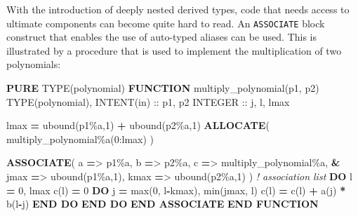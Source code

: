 \documentclass[
]{article}
\newenvironment{Shaded}{}{}
\newcommand{\BuiltInTok}[1]{\textcolor[rgb]{0.00,0.50,0.00}{#1}}
\newcommand{\CommentTok}[1]{\textcolor[rgb]{0.38,0.63,0.69}{\textit{#1}}}
\newcommand{\DataTypeTok}[1]{\textcolor[rgb]{0.56,0.13,0.00}{#1}}
\newcommand{\DecValTok}[1]{\textcolor[rgb]{0.25,0.63,0.44}{#1}}
\newcommand{\FunctionTok}[1]{\textcolor[rgb]{0.02,0.16,0.49}{#1}}
\newcommand{\KeywordTok}[1]{\textcolor[rgb]{0.00,0.44,0.13}{\textbf{#1}}}
\newcommand{\NormalTok}[1]{#1}
\newcommand{\OperatorTok}[1]{\textcolor[rgb]{0.40,0.40,0.40}{#1}}
\begin{document}
With the introduction of deeply nested derived types, code that needs
access to ultimate components can become quite hard to read. An
\texttt{ASSOCIATE} block construct that enables the use of auto-typed
aliases can be used. This is illustrated by a procedure that is used to
implement the multiplication of two polynomials:

\begin{Shaded}
\begin{Highlighting}[]
\KeywordTok{PURE} \DataTypeTok{TYPE(polynomial)} \KeywordTok{FUNCTION}\NormalTok{ multiply\_polynomial(p1, p2)}
   \DataTypeTok{TYPE(polynomial)}\NormalTok{, }\DataTypeTok{INTENT(in)} \DataTypeTok{::}\NormalTok{ p1, p2}
   \DataTypeTok{INTEGER} \DataTypeTok{::}\NormalTok{ j, l, lmax}

\NormalTok{   lmax }\KeywordTok{=} \FunctionTok{ubound}\NormalTok{(p1}\OperatorTok{\%}\NormalTok{a,}\DecValTok{1}\NormalTok{) }\KeywordTok{+} \FunctionTok{ubound}\NormalTok{(p2}\OperatorTok{\%}\NormalTok{a,}\DecValTok{1}\NormalTok{)}
   \KeywordTok{ALLOCATE}\NormalTok{( multiply\_polynomial}\OperatorTok{\%}\NormalTok{a(}\DecValTok{0}\NormalTok{:lmax) )}

   \KeywordTok{ASSOCIATE}\NormalTok{( a }\KeywordTok{=}\OperatorTok{\textgreater{}}\NormalTok{ p1}\OperatorTok{\%}\NormalTok{a, b }\KeywordTok{=}\OperatorTok{\textgreater{}}\NormalTok{ p2}\OperatorTok{\%}\NormalTok{a, c }\KeywordTok{=}\OperatorTok{\textgreater{}}\NormalTok{ multiply\_polynomial}\OperatorTok{\%}\NormalTok{a, }\KeywordTok{\&}
\NormalTok{              jmax }\KeywordTok{=}\OperatorTok{\textgreater{}} \FunctionTok{ubound}\NormalTok{(p1}\OperatorTok{\%}\NormalTok{a,}\DecValTok{1}\NormalTok{), kmax }\KeywordTok{=}\OperatorTok{\textgreater{}} \FunctionTok{ubound}\NormalTok{(p2}\OperatorTok{\%}\NormalTok{a,}\DecValTok{1}\NormalTok{) )  }\CommentTok{! association list}
      \KeywordTok{DO}\NormalTok{ l }\KeywordTok{=} \DecValTok{0}\NormalTok{, lmax}
\NormalTok{         c(l) }\KeywordTok{=} \DecValTok{0}
         \KeywordTok{DO}\NormalTok{ j }\KeywordTok{=} \BuiltInTok{max}\NormalTok{(}\DecValTok{0}\NormalTok{, l}\KeywordTok{{-}}\NormalTok{kmax), }\BuiltInTok{min}\NormalTok{(jmax, l)}
\NormalTok{            c(l) }\KeywordTok{=}\NormalTok{ c(l) }\KeywordTok{+}\NormalTok{ a(j) }\KeywordTok{*}\NormalTok{ b(l}\KeywordTok{{-}}\NormalTok{j)}
         \KeywordTok{END DO}
      \KeywordTok{END DO}
   \KeywordTok{END ASSOCIATE}
\KeywordTok{END FUNCTION}
\end{Highlighting}
\end{Shaded}
\end{document}
